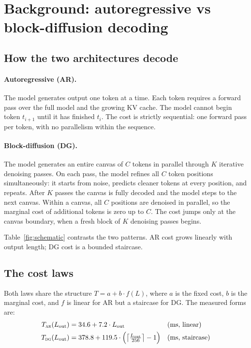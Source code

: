 \section{Background: autoregressive vs block-diffusion decoding}
\label{sec:laws}

\subsection{How the two architectures decode}

\paragraph{Autoregressive (AR).}
The model generates output one token at a time. Each token requires a
forward pass over the full model and the growing KV cache. The model
cannot begin token $t_{i+1}$ until it has finished $t_i$. The cost is
strictly sequential: one forward pass per token, with no parallelism
within the sequence.

\paragraph{Block-diffusion (DG).}
The model generates an entire canvas of $C$ tokens in parallel
through $K$ iterative denoising passes. On each pass, the model
refines all $C$ token positions simultaneously: it starts from noise,
predicts cleaner tokens at every position, and repeats. After $K$
passes the canvas is fully decoded and the model steps to the next
canvas. Within a canvas, all $C$ positions are denoised in parallel,
so the marginal cost of additional tokens is zero up to $C$. The cost
jumps only at the canvas boundary, when a fresh block of $K$ denoising
passes begins.

Table~\ref{fig:schematic} contrasts the two patterns. AR cost grows
linearly with output length; DG cost is a bounded staircase.

\subsection{The cost laws}

Both laws share the structure $T = a + b \cdot f(L)$, where $a$ is the
fixed cost, $b$ is the marginal cost, and $f$ is linear for AR but a
staircase for DG. The measured forms are:
\begin{align}
\label{eq:ar}
T_{\textsc{ar}}(L_{\mathrm{out}}) &= 34.6 + 7.2 \cdot L_{\mathrm{out}} && \text{(ms, linear)} \\
\label{eq:dg}
T_{\textsc{dg}}(L_{\mathrm{out}}) &= 378.8 + 119.5 \cdot \Bigl(\bigl\lceil \tfrac{L_{\mathrm{out}}}{256}\bigr\rceil - 1\Bigr) && \text{(ms, staircase)}
\end{align}

